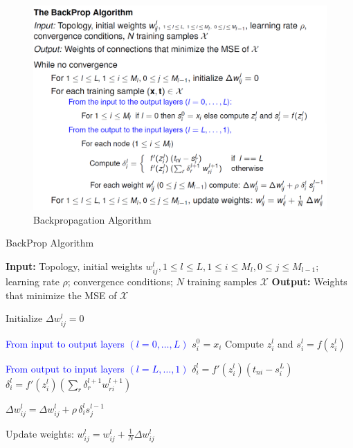\begin{figure}[htbp]
   \centering
   \includegraphics{images/08/backprop.png}
   \caption{Backpropagation Algorithm}
   \label{fig:08/backprop}
\end{figure}

\newpage
\begin{algorithm}
\caption{BackProp Algorithm}
\begin{algorithmic}[1]
\State \textbf{Input:} Topology, initial weights $w_{ij}^l, 1 \leq l \leq L, 1 \leq i \leq M_l, 0 \leq j \leq M_{l-1}$; learning rate $\rho$; convergence conditions; $N$ training samples $\mathcal{X}$
\State \textbf{Output:} Weights that minimize the MSE of $\mathcal{X}$

        \State Initialize $\Delta w_{ij}^l = 0$
    \EndFor

        \Comment \textcolor{blue}{From input to output layers $(l = 0, \dots, L)$}
                \State $s_i^0 = x_i$
            \Else
                \State Compute $z_i^l$ and $s_i^l = f(z_i^l)$
            \EndIf
        \EndFor

        \Comment \textcolor{blue}{From output to input layers $(l = L, \dots, 1)$}
                \State $\delta_i^l = f'(z_i^l)(t_{ni} - s_i^L)$
            \Else
                \State $\delta_i^l = f'(z_i^l)\left( \sum_r \delta_r^{l+1} w_{ri}^{l+1} \right)$
            \EndIf
        \EndFor

            \State $\Delta w_{ij}^l = \Delta w_{ij}^l + \rho \, \delta_i^l s_j^{l-1}$
        \EndFor
    \EndFor

        \State Update weights: $w_{ij}^l = w_{ij}^l + \frac{1}{N} \Delta w_{ij}^l$
    \EndFor
\EndWhile

\end{algorithmic}
\end{algorithm}

